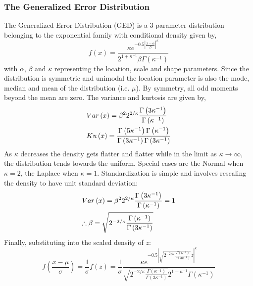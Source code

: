 \subsubsection{The Generalized Error Distribution}\label{geddist}
The Generalized Error Distribution (GED) is a 3 parameter distribution belonging
to the exponential family with conditional density given by,
\begin{equation}\label{eq:ged1}
f\left( x \right) = \frac{{\kappa {e^{ - 0.5{{\left| {\frac{{x - \alpha }}
{\beta }} \right|}^\kappa }}}}}
{{{2^{1 + {\kappa ^{ - 1}}}}\beta \Gamma \left( {{\kappa ^{ - 1}}} \right)}}
\end{equation}
with $\alpha$, $\beta$ and $\kappa$ representing the location, scale and
shape parameters. Since the distribution is symmetric and unimodal the location
parameter is also the mode, median and mean of the distribution (i.e. $\mu$).
By symmetry, all odd moments beyond the mean are zero. The variance and kurtosis
are given by,
\begin{equation}\label{eq:ged2}
\begin{gathered}
  Var\left( x \right) = {\beta ^2}{2^{2/\kappa }}\frac{{\Gamma \left( {3{\kappa ^{ - 1}}} \right)}}
{{\Gamma \left( {{\kappa ^{ - 1}}} \right)}} \hfill \\
  Ku\left( x \right) = \frac{{\Gamma \left( {5{\kappa ^{ - 1}}} \right)\Gamma \left( {{\kappa ^{ - 1}}} \right)}}
{{\Gamma \left( {3{\kappa ^{ - 1}}} \right)\Gamma \left( {3{\kappa ^{ - 1}}} \right)}} \hfill \\
\end{gathered}
\end{equation}
As $\kappa$ decreases the density gets flatter and flatter while in the limit as
$\kappa  \to \infty$, the distribution tends towards the uniform. Special cases
are the Normal when $\kappa=2$, the Laplace when $\kappa=1$. Standardization is
simple and involves rescaling the density to have unit standard deviation:
\begin{equation}\label{eq:ged3}
\begin{gathered}
  Var\left( x \right) = {\beta ^2}{2^{2/\kappa }}\frac{{\Gamma \left( {3{\kappa ^{ - 1}}} \right)}}
{{\Gamma \left( {{\kappa ^{ - 1}}} \right)}} = 1 \hfill \\
  \therefore \beta  = \sqrt {{2^{ - 2/\kappa }}\frac{{\Gamma \left( {{\kappa ^{ - 1}}} \right)}}
{{\Gamma \left( {3{\kappa ^{ - 1}}} \right)}}}  \hfill \\
\end{gathered}
\end{equation}
Finally, substituting into the scaled density of $z$:
\begin{equation}\label{eq:ged3}
f\left( {\frac{{x - \mu }}
{\sigma }} \right) = \frac{1}
{\sigma }f\left( z \right) = \frac{1}
{\sigma }\frac{{\kappa {e^{ - 0.5{{\left| {\sqrt {{2^{ - 2/\kappa }}\frac{{\Gamma \left( {{\kappa ^{ - 1}}} \right)}}
{{\Gamma \left( {3{\kappa ^{ - 1}}} \right)}}} z} \right|}^\kappa }}}}}
{{\sqrt {{2^{ - 2/\kappa }}\frac{{\Gamma \left( {{\kappa ^{ - 1}}} \right)}}
{{\Gamma \left( {3{\kappa ^{ - 1}}} \right)}}} {2^{1 + {\kappa ^{ - 1}}}}\Gamma \left( {{\kappa ^{ - 1}}} \right)}}
\end{equation}

